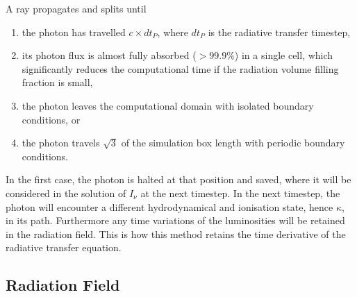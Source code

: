 \documentclass[useAMS,usenatbib]{mn2e}
\begin{document}
A ray propagates and splits until 
%
\begin{enumerate}
\item the photon has travelled $c \times dt_P$, where $dt_P$ is the
  radiative transfer timestep,
\item its photon flux is almost fully absorbed ($>99.9\%$) in a single
  cell, which significantly reduces the computational time if the
  radiation volume filling fraction is small,
\item the photon leaves the computational domain with isolated
  boundary conditions, or
\item the photon travels $\sqrt{3}$ of the simulation box length with
  periodic boundary conditions.
\end{enumerate}
%
In the first case, the photon is halted at that position and saved,
where it will be considered in the solution of $I_\nu$ at the next
timestep.  In the next timestep, the photon will encounter a different
hydrodynamical and ionisation state, hence $\kappa$, in its path.
Furthermore any time variations of the luminosities will be retained
in the radiation field.  This is how this method retains the time
derivative of the radiative transfer equation.



\subsection{Radiation Field}
\end{document}

